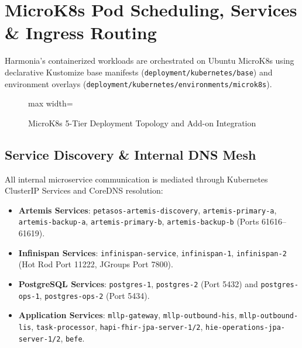
\chapter{MicroK8s Pod Scheduling, Services \& Ingress Routing}
\label{chap:microk8s_workloads}

Harmonia's containerized workloads are orchestrated on Ubuntu MicroK8s using declarative Kustomize base manifests (\texttt{deployment/kubernetes/base}) and environment overlays (\texttt{deployment/kubernetes/environments/microk8s}).

\begin{figure}[htbp]
    \centering
    \begin{adjustbox}{max width=\textwidth}
        
    \end{adjustbox}
    \caption{MicroK8s 5-Tier Deployment Topology and Add-on Integration}
    \label{fig:5tier_deployment_topology}
\end{figure}

\section{Service Discovery \& Internal DNS Mesh}

All internal microservice communication is mediated through Kubernetes ClusterIP Services and CoreDNS resolution:
\begin{itemize}
    \item \textbf{Artemis Services}: \texttt{petasos-artemis-discovery}, \texttt{artemis-primary-a}, \texttt{artemis-backup-a}, \texttt{artemis-primary-b}, \texttt{artemis-backup-b} (Ports 61616--61619).
    \item \textbf{Infinispan Services}: \texttt{infinispan-service}, \texttt{infinispan-1}, \texttt{infinispan-2} (Hot Rod Port 11222, JGroups Port 7800).
    \item \textbf{PostgreSQL Services}: \texttt{postgres-1}, \texttt{postgres-2} (Port 5432) and \texttt{postgres-ops-1}, \texttt{postgres-ops-2} (Port 5434).
    \item \textbf{Application Services}: \texttt{mllp-gateway}, \texttt{mllp-outbound-his}, \texttt{mllp-outbound-lis}, \texttt{task-processor}, \texttt{hapi-fhir-jpa-server-1/2}, \texttt{hie-operations-jpa-server-1/2}, \texttt{befe}.
\end{itemize}

